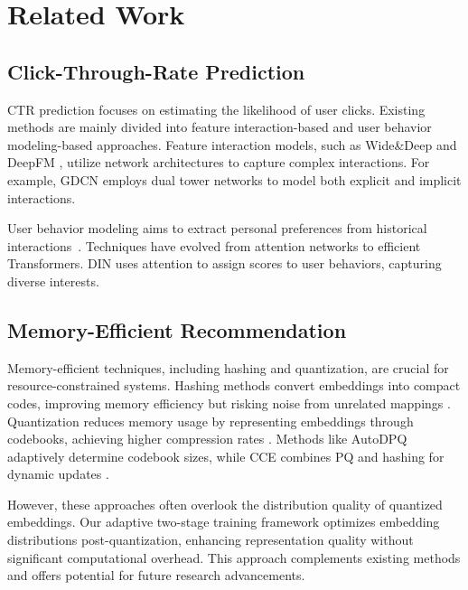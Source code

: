

\section{Related Work}
    \subsection{Click-Through-Rate Prediction}
        CTR prediction focuses on estimating the likelihood of user clicks. Existing methods are mainly divided into feature interaction-based and user behavior modeling-based approaches. Feature interaction models, such as Wide\&Deep \cite{WideDeep} and DeepFM \cite{DeepFM}, utilize network architectures to capture complex interactions. For example, GDCN \cite{GDCN} employs dual tower networks to model both explicit and implicit interactions.

        User behavior modeling aims to extract personal preferences from historical interactions~\cite{important_2_perlaw,important_4_dataset,other_3_fuxi,other_12_learning,other_15_apgl4sr,other_19_hypersorec,other_20_mcne}. Techniques have evolved from attention networks \cite{zhou2018deep} to efficient Transformers. DIN \cite{zhou2018deep} uses attention to assign scores to user behaviors, capturing diverse interests.

    \subsection{Memory-Efficient Recommendation}
        Memory-efficient techniques, including hashing and quantization, are crucial for resource-constrained systems. Hashing methods convert embeddings into compact codes, improving memory efficiency but risking noise from unrelated mappings \cite{hashing_trick,DHE}. Quantization reduces memory usage by representing embeddings through codebooks, achieving higher compression rates \cite{DPQ}. Methods like AutoDPQ adaptively determine codebook sizes, while CCE combines PQ and hashing for dynamic updates \cite{AutoDPQ}.

        However, these approaches often overlook the distribution quality of quantized embeddings. Our adaptive two-stage training framework optimizes embedding distributions post-quantization, enhancing representation quality without significant computational overhead. This approach complements existing methods and offers potential for future research advancements.
